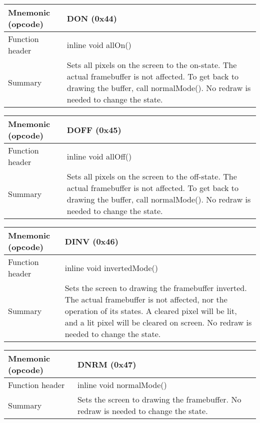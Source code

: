 \begin{table}[H]
\begin {tabularx} {\textwidth} {l|X} Mnemonic (opcode) &  DON  (0x44)\bigskip\\ 
\hline 
 \hline 
Function header & inline void allOn()\bigskip\\ 
Summary &  Sets all pixels on the screen to the on-state. The actual framebuffer is not affected. To get back to drawing the buffer, call normalMode(). No redraw is needed to change the state. \bigskip\\ 
\hline 
 \end{tabularx} 
 \end{table} 
\begin{table}[H]
\begin {tabularx} {\textwidth} {l|X} Mnemonic (opcode) &  DOFF  (0x45)\bigskip\\ 
\hline 
 \hline 
Function header & inline void allOff()\bigskip\\ 
Summary &  Sets all pixels on the screen to the off-state. The actual framebuffer is not affected. To get back to drawing the buffer, call normalMode(). No redraw is needed to change the state. \bigskip\\ 
\hline 
 \end{tabularx} 
 \end{table} 
\begin{table}[H]
\begin {tabularx} {\textwidth} {l|X} Mnemonic (opcode) &  DINV  (0x46)\bigskip\\ 
\hline 
 \hline 
Function header & inline void invertedMode()\bigskip\\ 
Summary &  Sets the screen to drawing the framebuffer inverted. The actual framebuffer is not affected, nor the operation of its states. A cleared pixel will be lit, and a lit pixel will be cleared on screen. No redraw is needed to change the state. \bigskip\\ 
\hline 
 \end{tabularx} 
 \end{table} 
\begin{table}[H]
\begin {tabularx} {\textwidth} {l|X} Mnemonic (opcode) &  DNRM  (0x47)\bigskip\\ 
\hline 
 \hline 
Function header & inline void normalMode()\bigskip\\ 
Summary &  Sets the screen to drawing the framebuffer. No redraw is needed to change the state. \bigskip\\ 
\hline 
 \end{tabularx} 
 \end{table} 

